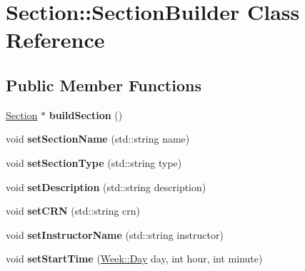 \hypertarget{class_section_1_1_section_builder}{}\section{Section\+:\+:Section\+Builder Class Reference}
\label{class_section_1_1_section_builder}
\subsection*{Public Member Functions}
\begin{DoxyCompactItemize}
\item 
\hypertarget{class_section_1_1_section_builder_a754078187f7a351a5df1ca496978c6e4}{}\hyperlink{class_section}{Section} $\ast$ {\bfseries build\+Section} ()\label{class_section_1_1_section_builder_a754078187f7a351a5df1ca496978c6e4}

\item 
\hypertarget{class_section_1_1_section_builder_a89b143aa5c85fa1b5868636ea3b360f8}{}void {\bfseries set\+Section\+Name} (std\+::string name)\label{class_section_1_1_section_builder_a89b143aa5c85fa1b5868636ea3b360f8}

\item 
\hypertarget{class_section_1_1_section_builder_ad56fd0e3a5d6ecbfe3ba88e1f6266e29}{}void {\bfseries set\+Section\+Type} (std\+::string type)\label{class_section_1_1_section_builder_ad56fd0e3a5d6ecbfe3ba88e1f6266e29}

\item 
\hypertarget{class_section_1_1_section_builder_abd6bd2d6b30be57bbc1974711f3c3d3a}{}void {\bfseries set\+Description} (std\+::string description)\label{class_section_1_1_section_builder_abd6bd2d6b30be57bbc1974711f3c3d3a}

\item 
\hypertarget{class_section_1_1_section_builder_a3c66aed282b0abfea31344711e2c3b2f}{}void {\bfseries set\+C\+R\+N} (std\+::string crn)\label{class_section_1_1_section_builder_a3c66aed282b0abfea31344711e2c3b2f}

\item 
\hypertarget{class_section_1_1_section_builder_ad2e45583f538c3333c7492970122f5ae}{}void {\bfseries set\+Instructor\+Name} (std\+::string instructor)\label{class_section_1_1_section_builder_ad2e45583f538c3333c7492970122f5ae}

\item 
\hypertarget{class_section_1_1_section_builder_ad1bddba1afda68172657c107a3b82d0d}{}void {\bfseries set\+Start\+Time} (\hyperlink{class_week_a1f85a077c83820a97fad2a6d50c3a075}{Week\+::\+Day} day, int hour, int minute)\label{class_section_1_1_section_builder_ad1bddba1afda68172657c107a3b82d0d}


\end{DoxyCompactItemize}

